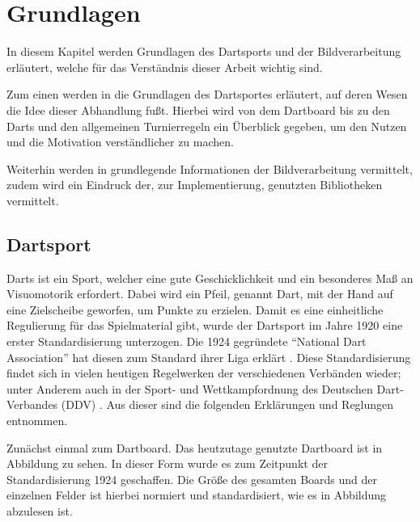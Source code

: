 
\chapter{Grundlagen}
\label{chap:fundamentals}
In diesem Kapitel werden Grundlagen des Dartsports und der Bildverarbeitung erläutert, welche für das Verständnis dieser Arbeit wichtig sind. 

Zum einen werden in  die Grundlagen des Dartsportes erläutert, auf deren Wesen die Idee dieser Abhandlung fußt. Hierbei wird von dem Dartboard bis zu den Darts und den allgemeinen Turnierregeln ein Überblick gegeben, um den Nutzen und die Motivation verständlicher zu machen.

Weiterhin werden in  grundlegende Informationen der Bildverarbeitung vermittelt, zudem wird ein Eindruck der, zur Implementierung, genutzten Bibliotheken vermittelt.

\section{Dartsport}
\label{sec:darts}
Darts ist ein Sport, welcher eine gute Geschicklichkeit und ein besonderes Maß an Visuomotorik erfordert. Dabei wird ein Pfeil, genannt Dart, mit der Hand auf eine Zielscheibe geworfen, um Punkte zu erzielen. Damit es eine einheitliche Regulierung für das Spielmaterial gibt, wurde der Dartsport im Jahre 1920 eine erster Standardisierung unterzogen. Die 1924 gegründete "`National Dart Association"' hat diesen zum Standard ihrer Liga erklärt \autocite[5]{guide2013}. Diese Standardisierung findet sich in vielen heutigen Regelwerken der verschiedenen Verbänden wieder; unter Anderem auch in der Sport- und Wettkampfordnung des Deutschen
Dart-Verbandes (DDV) \autocite{DartsRegel2016}. Aus dieser sind die folgenden Erklärungen und Reglungen entnommen. 

Zunächst einmal zum Dartboard. Das heutzutage genutzte Dartboard ist in Abbildung zu sehen. In dieser Form wurde es zum Zeitpunkt der Standardisierung 1924 geschaffen. Die Größe des gesamten Boards und der einzelnen Felder ist hierbei normiert und standardisiert, wie es in Abbildung  abzulesen ist. 

